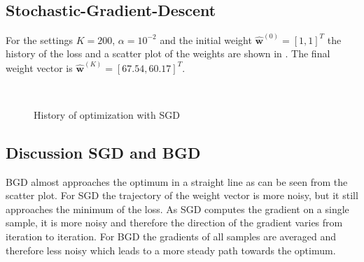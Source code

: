 \documentclass[12pt,a4paper]{scrartcl}
\newcommand{\matr}[1]{\mathbf{#1}}
\begin{document}
	
	\subsection*{Stochastic-Gradient-Descent}
	
	For the settings $K=200$, $\alpha = 10^{-2}$ and the initial weight $\matr{\hat{w}}^{(0)} = [1, 1]^T$ the history of the loss and a scatter plot of the weights are shown in . The final weight vector is $\matr{\hat{w}}^{(K)} = [67.54, 60.17]^T$.
	
	\begin{figure}[H]
		\centering	
		\\
		\caption{History of optimization with SGD}
		\label{fig:ex3_1_sgd}
	\end{figure}
	
	
	\subsection*{Discussion SGD and BGD}
	
	BGD almost approaches the optimum in a straight line as can be seen from the scatter plot. For SGD the trajectory of the weight vector is more noisy, but it still approaches the minimum of the loss.
	As SGD computes the gradient on a single sample, it is more noisy and therefore the direction of the gradient varies from iteration to iteration. For BGD the gradients of all samples are averaged and therefore less noisy which leads to a more steady path towards the optimum.
	
\end{document}
